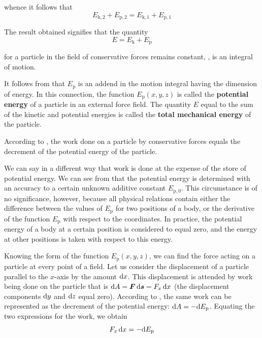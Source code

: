 \noindent
whence it follows that
\begin{equation*}
E_{\text{k},2} + E_{\text{p},2} = E_{\text{k},1} + E_{\text{p},1}
\end{equation*}

\noindent
The result obtained signifies that the quantity
\begin{equation}\label{eq:3_28}
E = E_{\text{k}} + E_{\text{p}}
\end{equation}

\noindent
for a particle in the field of conservative forces remains constant, \ie, is an integral of motion.

It follows from  that $E_{\text{p}}$ is an addend in the motion integral having the dimension of energy. In this connection, the function $E_{\text{p}}(x,y,z)$ is called the \textbf{potential energy} of a particle in an external force field. The quantity $E$ equal to the sum of the kinetic and potential energies is called the \textbf{total mechanical energy} of the particle.

According to , the work done on a particle by conservative forces equals the decrement of the potential energy of the particle.

We can say in a different way that work is done at the expense of the store of potential energy. We can see from  that the potential energy is determined with an accuracy to a certain unknown additive constant $E_{\text{p},0}$. This circumstance is of no significance, however, because all physical relations contain either the difference between the values of $E_{\text{p}}$ for two positions of a body, or the derivative of the function $E_{\text{p}}$ with respect to the coordinates. In practice, the potential energy of a body at a certain position is considered to equal zero, and the energy at other positions is taken with respect to this energy.

Knowing the form of the function $E_{\text{p}}(x,y,z)$, we can find the force acting on a particle at every point of a field. Let us consider the displacement of a particle parallel to the $x$-axis by the amount $\mathrm{d} x$. This displacement is attended by work being done on the particle that is $\mathrm{d} A=\boldsymbol{F}\,\mathrm{d}\boldsymbol{s}=F_x\,\mathrm{d} x$ (the displacement components $\mathrm{d} y$ and $\mathrm{d} z$ equal zero). According to , the same work can be represented as the decrement of the potential energy: $\mathrm{d} A=-\mathrm{d} E_{\text{p}}$. Equating the two expressions for the work, we obtain
\begin{equation*}
F_x\,\mathrm{d} x = -\mathrm{d} E_{\text{p}}
\end{equation*}

